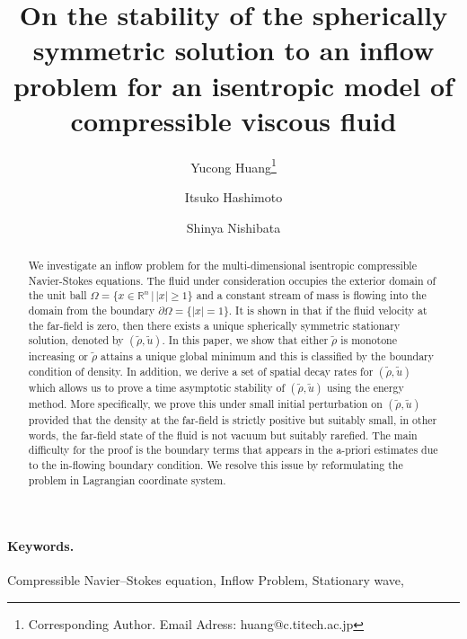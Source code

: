 \documentclass[a4paper,12pt,draft]{article}
\theoremstyle{remark}
\def\R{\mathbb{R}}
\def\d{\partial}
\def\ut{\tilde{u}}
\def\rt{\tilde{\rho}}
\begin{document}
\title{
On the stability of the spherically symmetric solution
to an inflow problem for an isentropic model of compressible viscous fluid}
\date{}
\author[$1$]{Yucong {\sc Huang}\footnote{Corresponding Author. Email Adress: huang@c.titech.ac.jp}}
\author[$2$]{Itsuko {\sc Hashimoto}} 
\author[$1$]{Shinya {\sc Nishibata}}



\maketitle

\vspace{-6mm}

\begin{abstract}
    We investigate an inflow problem for the multi-dimensional isentropic compressible Navier-Stokes equations. The fluid under consideration occupies the exterior domain of the unit ball $\Omega=\{x\in\R^n\,\vert\, |x|\ge 1\}$ and a constant stream of mass is flowing into the domain from the boundary $\d\Omega=\{|x|=1\}$. It is shown in \cite{h-m21} that if the fluid velocity at the far-field is zero, then there exists a unique spherically symmetric stationary solution, denoted by $(\rt,\ut)$. In this paper, we show that either $\rt$ is monotone increasing or $\rt$ attains a unique global minimum and this is classified by the boundary condition of density. In addition, we derive a set of spatial decay rates for $(\rt,\ut)$ which allows us to prove a time asymptotic stability of $(\rt,\ut)$ using the energy method. More specifically, we prove this under small initial perturbation on $(\rt,\ut)$ provided that the density at the far-field is strictly positive but suitably small, in other words, the far-field state of the fluid is not vacuum but suitably rarefied. The main difficulty for the proof is the boundary terms that appears in the a-priori estimates due to the in-flowing boundary condition. We resolve this issue by reformulating the problem in Lagrangian coordinate system.
\end{abstract}

\paragraph{Keywords.}
Compressible Navier--Stokes equation, Inflow Problem, Stationary wave,
\vspace{-6mm}
\end{document}
